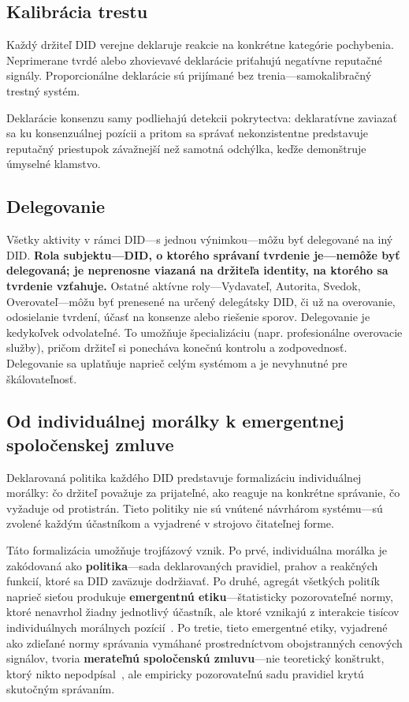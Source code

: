 \documentclass[11pt,a4paper,twocolumn]{article}
\begin{document}
\subsection{Kalibrácia trestu}

Každý držiteľ DID verejne deklaruje reakcie na konkrétne kategórie pochybenia. Neprimerane tvrdé alebo zhovievavé deklarácie priťahujú negatívne reputačné signály. Proporcionálne deklarácie sú prijímané bez trenia---samokalibračný trestný systém.

Deklarácie konsenzu samy podliehajú detekcii pokrytectva: deklaratívne zaviazať sa ku konsenzuálnej pozícii a pritom sa správať nekonzistentne predstavuje reputačný priestupok závažnejší než samotná odchýlka, keďže demonštruje úmyselné klamstvo.

\subsection{Delegovanie}

Všetky aktivity v rámci DID---s jednou výnimkou---môžu byť delegované na iný DID. \textbf{Rola subjektu---DID, o ktorého správaní tvrdenie je---nemôže byť delegovaná; je neprenosne viazaná na držiteľa identity, na ktorého sa tvrdenie vzťahuje.} Ostatné aktívne roly---Vydavateľ, Autorita, Svedok, Overovateľ---môžu byť prenesené na určený delegátsky DID, či už na overovanie, odosielanie tvrdení, účasť na konsenze alebo riešenie sporov. Delegovanie je kedykoľvek odvolateľné. To umožňuje špecializáciu (napr. profesionálne overovacie služby), pričom držiteľ si ponecháva konečnú kontrolu a zodpovednosť. Delegovanie sa uplatňuje naprieč celým systémom a je nevyhnutné pre škálovateľnosť.

\subsection{Od individuálnej morálky k emergentnej spoločenskej zmluve}

Deklarovaná politika každého DID predstavuje formalizáciu individuálnej morálky: čo držiteľ považuje za prijateľné, ako reaguje na konkrétne správanie, čo vyžaduje od protistrán. Tieto politiky nie sú vnútené návrhárom systému---sú zvolené každým účastníkom a vyjadrené v strojovo čitateľnej forme.

Táto formalizácia umožňuje trojfázový vznik. Po prvé, individuálna morálka je zakódovaná ako \textbf{politika}---sada deklarovaných pravidiel, prahov a reakčných funkcií, ktoré sa DID zaväzuje dodržiavať. Po druhé, agregát všetkých politík naprieč sieťou produkuje \textbf{emergentnú etiku}---štatisticky pozorovateľné normy, ktoré nenavrhol žiadny jednotlivý účastník, ale ktoré vznikajú z interakcie tisícov individuálnych morálnych pozícií~\cite{durkheim1893}. Po tretie, tieto emergentné etiky, vyjadrené ako zdieľané normy správania vymáhané prostredníctvom obojstranných cenových signálov, tvoria \textbf{merateľnú spoločenskú zmluvu}---nie teoretický konštrukt, ktorý nikto nepodpísal~\cite{rawls1971}, ale empiricky pozorovateľnú sadu pravidiel krytú skutočným správaním.
\end{document}
